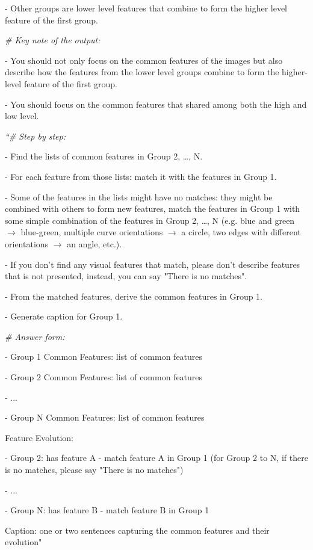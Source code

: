 - Other groups are lower level features that combine to form the higher level feature of the first group.

\emph{\# Key note of the output:}

- You should not only focus on the common features of the images but also describe how the features from the lower level groups combine to form the higher-level feature of the first group.

- You should focus on the common features that shared among both the high and low level.

\emph{``\# Step by step:}

- Find the lists of common features in Group 2, \dots, N.

- For each feature from those lists: match it with the features in Group 1.

- Some of the features in the lists might have no matches: they might be combined with others to form new features, match the features in Group 1 with some simple combination of the features in Group 2, \dots, N (e.g. blue and green $\xrightarrow{}$ blue-green, multiple curve orientations $\xrightarrow{}$ a circle, two edges with different orientations $\xrightarrow{}$ an angle, etc.).

- If you don't find any visual features that match, please don't describe features that is not presented, instead, you can say "There is no matches".

- From the matched features, derive the common features in Group 1. 

- Generate caption for Group 1.

\emph{\# Answer form:}

- Group 1 Common Features: list of common features

- Group 2 Common Features: list of common features

- ...

- Group N Common Features: list of common features

Feature Evolution:

    - Group 2: has feature A - match feature A in Group 1 (for Group 2 to N, if there is no matches, please say "There is no matches")
    
    - ...
    
    - Group N: has feature B - match feature B in Group 1
    
Caption: one or two sentences capturing the common features and their evolution"